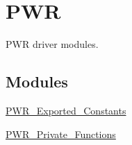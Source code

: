 \hypertarget{group___p_w_r}{\section{P\-W\-R}
\label{group___p_w_r}
}


P\-W\-R driver modules.  


\subsection*{Modules}
\begin{DoxyCompactItemize}
\item 
\hyperlink{group___p_w_r___exported___constants}{P\-W\-R\-\_\-\-Exported\-\_\-\-Constants}
\item 
\hyperlink{group___p_w_r___private___functions}{P\-W\-R\-\_\-\-Private\-\_\-\-Functions}
\end{DoxyCompactItemize}
